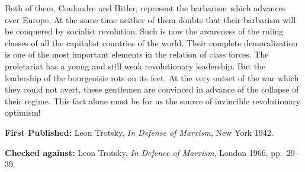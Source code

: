 Both of them, Coulondre and Hitler, represent the barbarism which advances over Europe. At the same time neither of them doubts that their barbarism will be conquered by socialist revolution. Such is now the awareness of the ruling classes of all the capitalist countries of the world. Their complete demoralization is one of the most important elements in the relation of class forces. The proletariat has a young and still weak revolutionary leadership. But the leadership of the bourgeoisie rots on its feet. At the very outset of the war which they could not avert, these gentlemen are convinced in advance of the collapse of their regime. This fact alone must be for us the source of invincible revolutionary optimism!

\newpage

\begin{letterinfo}
  \textbf{First Published:} Leon Trotsky, \emph{In Defense of Marxism}, New York 1942.
  
  \textbf{Checked against:} Leon Trotsky, \emph{In Defence of Marxism}, London 1966, pp.~29--39.
\end{letterinfo}